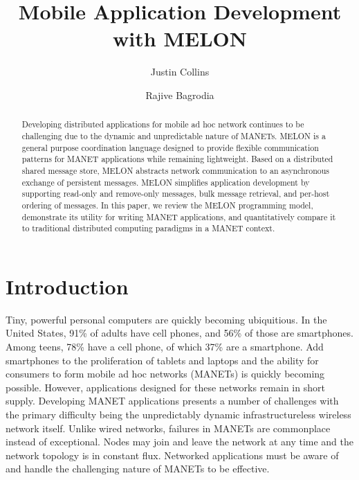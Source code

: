 \documentclass{llncs}
\begin{document}
%
\title{Mobile Application Development with MELON}
%
\author{Justin Collins \and Rajive Bagrodia}
%
%

\maketitle

\begin{abstract}
Developing distributed applications for mobile ad hoc network continues to be challenging due to the dynamic and unpredictable nature of MANETs. MELON is a general purpose coordination language designed to provide flexible communication patterns for MANET applications while remaining lightweight. Based on a distributed shared message store, MELON abstracts network communication to an asynchronous exchange of persistent messages. MELON simplifies application development by supporting read-only and remove-only messages, bulk message retrieval, and per-host ordering of messages. In this paper, we review the MELON programming model, demonstrate its utility for writing MANET applications, and quantitatively compare it to traditional distributed computing paradigms in a MANET context.
\end{abstract}
%

\section{Introduction}

Tiny, powerful personal computers are quickly becoming ubiquitious. In the United States, 91\% of adults have cell phones, and 56\% of those are smartphones\cite{cellphones}. Among teens, 78\% have a cell phone, of which 37\% are a smartphone\cite{teenphones}. Add smartphones to the proliferation of tablets and laptops and the ability for consumers to form mobile ad hoc networks (MANETs) is quickly becoming possible. However, applications designed for these networks remain in short supply. Developing MANET applications presents a number of challenges with the primary difficulty being the unpredictably dynamic infrastructureless wireless network itself. Unlike wired networks, failures in MANETs are commonplace instead of exceptional. Nodes may join and leave the network at any time and the network topology is in constant flux. Networked applications must be aware of and handle the challenging nature of MANETs to be effective.
\end{document}
